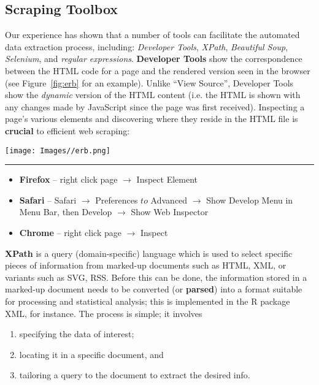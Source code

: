 \subsection{Scraping Toolbox} Our experience has shown that a number of tools can facilitate the automated data extraction process, including: 
\textit{Developer Tools}, \textit{XPath}, \textit{Beautiful Soup}, \textit{Selenium}, and \textit{regular expressions}. 
\newl\textbf{Developer Tools} show the correspondence between the HTML code for a page and the rendered version seen in the browser (see Figure~\ref{fig:erb} for an example). Unlike ``View Source'', Developer Tools show the \textit{dynamic} version of the HTML content (i.e. the HTML is shown with any changes made by JavaScript since the page was first received). Inspecting a page's various elements and discovering where they reside in the HTML file is \textbf{crucial} to efficient web scraping: 
\begin{figure*}[t]
\centering
\texttt{[image: Images//erb.png]}
\caption[\small Inspecting a webpage elements using Chrome's \textit{Developer Tools}]{\small Inspecting 's elements using Chrome's \textit{Developer Tools}.} \hrule\label{fig:erb}
\end{figure*}
\begin{itemize}[noitemsep]
\item \textbf{Firefox} -- right click page $\to$ Inspect Element
\item \textbf{Safari} -- Safari $\to$ Preferences $to$ Advanced $\to$ Show Develop Menu in Menu Bar, then  
Develop $\to$ Show Web Inspector
\item \textbf{Chrome} --  right click page $\to$ Inspect
\end{itemize}
\textbf{XPath} is a query (domain-specific) language which is 
used to select specific pieces of information from marked-up documents such as HTML, XML, or variants such as SVG, RSS. Before this can be done, the information stored in a marked-up document needs to be converted (or \textbf{parsed}) into a format suitable for processing and statistical analysis; this is implemented in the R package XML, for instance. The process is simple; it involves 
\begin{enumerate}[noitemsep]
\item specifying the data of interest;
\item locating it in a specific document, and
\item tailoring a query to the document to extract the desired info.
\end{enumerate}
